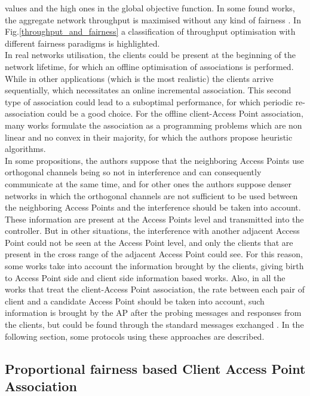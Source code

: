 \documentclass[journal,transmag]{IEEEtran}
\begin{document}
values and the high ones in the global objective function. In some found works, the aggregate network throughput is maximised without any kind of fairness \cite{15AP_association_MIMO}. In Fig.\ref{throughput_and_fairness} a classification of throughput optimisation with different fairness paradigms is highlighted.\\
In real networks utilisation, the clients could be present at the beginning of the network lifetime, for which an offline optimisation of associations is performed. While in other applications (which is the most realistic) the clients arrive sequentially, which necessitates an online incremental association. This second type of association could lead to a suboptimal performance, for which periodic re-association could be a good choice. For the offline client-Access Point association, many works formulate the association as a programming problems which are non linear and no convex in their majority, for which the authors propose heuristic algorithms. \\

In some propositions, the authors suppose that the neighboring Access Points use orthogonal channels being so not in interference and can consequently communicate at the same time, and for other ones the authors suppose denser networks in which the orthogonal channels are not sufficient to be used between the neighboring Access Points and the interference should be taken into account. These information are present at the Access Points level and transmitted into the controller. But in other situations, the interference with another adjacent Access Point could not be seen at the Access Point level, and only the clients that are present in the cross range of the adjacent Access Point could see. For this reason, some works take into account the information brought by the clients, giving birth to Access Point side and client side information based works. Also, in all the works that treat the client-Access Point association, the rate between each pair of client and a candidate Access Point should be taken into account, such information is brought by the AP after the probing messages and responses from the clients, but could be found through the standard messages exchanged \cite{08AP_assignement_algorithms}. In the following section, some protocols using these approaches are described. \\  


\subsection{Proportional fairness based Client Access Point Association} 
\end{document}
